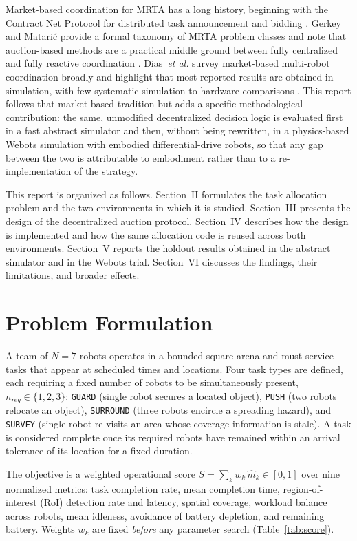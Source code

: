 \documentclass[conference]{IEEEtran}
\begin{document}
Market-based coordination for MRTA has a long history, beginning with the
Contract Net Protocol for distributed task announcement and bidding
\cite{smith1980}. Gerkey and Matari\'c provide a formal taxonomy of MRTA
problem classes and note that auction-based methods are a practical
middle ground between fully centralized and fully reactive coordination
\cite{gerkey2004}. Dias~\textit{et al.} survey market-based multi-robot
coordination broadly and highlight that most reported results are
obtained in simulation, with few systematic simulation-to-hardware
comparisons \cite{dias2006}. This report follows that market-based
tradition but adds a specific methodological contribution: the same,
unmodified decentralized decision logic is evaluated first in a fast
abstract simulator and then, without being rewritten, in a
physics-based Webots simulation with embodied differential-drive robots,
so that any gap between the two is attributable to embodiment rather than
to a re-implementation of the strategy.

This report is organized as follows. Section~II formulates the task
allocation problem and the two environments in which it is studied.
Section~III presents the design of the decentralized auction protocol.
Section~IV describes how the design is implemented and how the same
allocation code is reused across both environments. Section~V reports the
holdout results obtained in the abstract simulator and in the Webots
trial. Section~VI discusses the findings, their limitations, and broader
effects.

\section{Problem Formulation}

A team of $N{=}7$ robots operates in a bounded square arena and must
service tasks that appear at scheduled times and locations. Four task
types are defined, each requiring a fixed number of robots to be
simultaneously present, $n_{req}\in\{1,2,3\}$: \texttt{GUARD} (single
robot secures a located object), \texttt{PUSH} (two robots relocate an
object), \texttt{SURROUND} (three robots encircle a spreading hazard),
and \texttt{SURVEY} (single robot re-visits an area whose coverage
information is stale). A task is considered complete once its required
robots have remained within an arrival tolerance of its location for a
fixed duration.

The objective is a weighted operational score
$S=\sum_k w_k\,\hat{m}_k\in[0,1]$ over nine normalized metrics: task
completion rate, mean completion time, region-of-interest (RoI) detection
rate and latency, spatial coverage, workload balance across robots, mean
idleness, avoidance of battery depletion, and remaining battery. Weights
$w_k$ are fixed \emph{before} any parameter search (Table~\ref{tab:score}).
\end{document}
